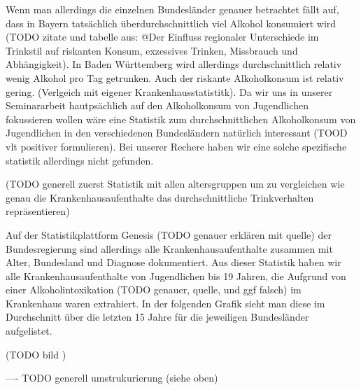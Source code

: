 \documentclass{article}
\begin{document}
Wenn man allerdings die einzelnen Bundesländer genauer betrachtet fällt auf, dass in Bayern tatsächlich überdurchschnittlich viel Alkohol konsumiert wird (TODO zitate und tabelle aus: @Der Einfluss regionaler Unterschiede im Trinkstil auf riskanten Konsum, exzessives Trinken, Missbrauch und Abhängigkeit). In Baden Württemberg wird allerdings durchschnittlich relativ wenig Alkohol pro Tag getrunken. Auch der riskante Alkoholkonsum ist relativ gering. (Verlgeich mit eigener Krankenhausstatistitk). Da wir uns in unserer Seminararbeit hautpsächlich auf den Alkoholkonsum von Jugendlichen fokussieren wollen wäre eine Statistik zum durchschnittlichen Alkoholkonsum von Jugendlichen in den verschiedenen Bundesländern natürlich interessant (TOOD vlt positiver formulieren). Bei unserer Rechere haben wir eine solche spezifische statistik allerdings nicht gefunden. 


(TODO generell zuerst Statistik mit allen altersgruppen um zu vergleichen wie genau die Krankenhausaufenthalte das durchschnittliche Trinkverhalten repräsentieren)

Auf der Statistikplattform Genesis (TODO genauer erklären mit quelle) der Bundesregierung sind allerdings alle Krankenhausaufenthalte zusammen mit Alter, Bundesland und Diagnose dokumentiert. Aus dieser Statistik haben wir alle Krankenhausaufenthalte von Jugendlichen bis 19 Jahren, die Aufgrund von einer Alkoholintoxikation (TODO genauer, quelle, und ggf falsch) im Krankenhaus waren extrahiert. In der folgenden Grafik sieht man diese im Durchschnitt über die letzten 15 Jahre für die jeweiligen Bundesländer aufgelistet.

(TODO bild )

---- TODO generell umstrukurierung (siehe oben)
\end{document}
